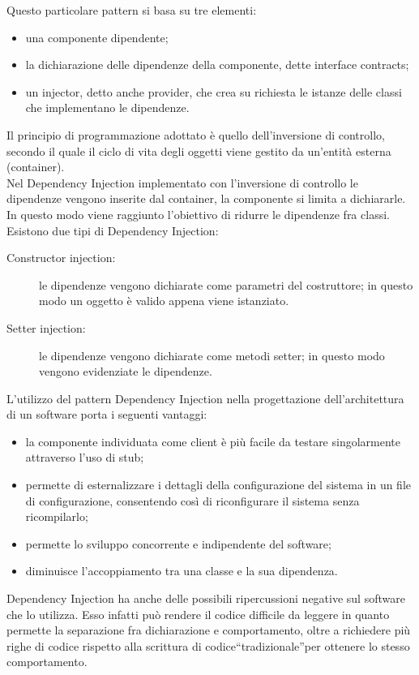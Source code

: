 Questo particolare pattern si basa su tre elementi:
\begin{itemize}
\item una componente dipendente;
\item la dichiarazione delle dipendenze della componente, dette interface contracts;
\item un injector, detto anche provider, che crea su richiesta le istanze delle classi che implementano le dipendenze.
\end{itemize}
Il principio di programmazione adottato è quello dell'inversione di controllo, secondo il quale il ciclo di vita degli oggetti viene gestito da un'entità esterna (container).\\
Nel Dependency Injection implementato con l'inversione di controllo le dipendenze vengono inserite dal container, la componente si limita a dichiararle. In questo modo viene raggiunto l'obiettivo di ridurre le dipendenze fra classi.\\
Esistono due tipi di Dependency Injection:
\begin{description}
	\item[Constructor injection:] le dipendenze vengono dichiarate come parametri del costruttore; in questo modo un oggetto è valido appena viene istanziato.
	\item[Setter injection:] le dipendenze vengono dichiarate come metodi setter; in questo modo vengono evidenziate le dipendenze.
\end{description}

L'utilizzo del pattern Dependency Injection nella progettazione dell'architettura di un software porta i seguenti vantaggi:
\begin{itemize}
\item la componente individuata come client è più facile da testare singolarmente attraverso l'uso di stub;
\item permette di esternalizzare i dettagli della configurazione del sistema in un file di configurazione, consentendo così di riconfigurare il sistema senza ricompilarlo;
\item permette lo sviluppo concorrente e indipendente del software;
\item diminuisce l'accoppiamento tra una classe e la sua dipendenza.
\end{itemize}
Dependency Injection ha anche delle possibili ripercussioni negative sul software che lo utilizza. Esso infatti può rendere il codice difficile da leggere in quanto permette la separazione fra dichiarazione e comportamento, oltre a richiedere più righe di codice rispetto alla scrittura di codice“tradizionale”per ottenere lo stesso comportamento.

